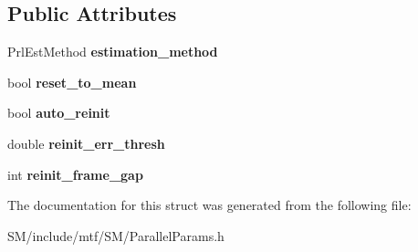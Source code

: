 \subsection*{Public Attributes}
\begin{DoxyCompactItemize}
\item 
\hypertarget{structParallelParams_a83f1bdd7bb0b1f79e8b4dc1daaf01b04}{Prl\-Est\-Method {\bfseries estimation\-\_\-method}}\label{structParallelParams_a83f1bdd7bb0b1f79e8b4dc1daaf01b04}

\item 
\hypertarget{structParallelParams_afe01009025027558172eb1effcb42fb5}{bool {\bfseries reset\-\_\-to\-\_\-mean}}\label{structParallelParams_afe01009025027558172eb1effcb42fb5}

\item 
\hypertarget{structParallelParams_a96ff70b51ba92852f875096b6d533ffc}{bool {\bfseries auto\-\_\-reinit}}\label{structParallelParams_a96ff70b51ba92852f875096b6d533ffc}

\item 
\hypertarget{structParallelParams_a0d8407f06fd7405f52d43372574dc657}{double {\bfseries reinit\-\_\-err\-\_\-thresh}}\label{structParallelParams_a0d8407f06fd7405f52d43372574dc657}

\item 
\hypertarget{structParallelParams_a4670e3549284e8e7569444727abc4cde}{int {\bfseries reinit\-\_\-frame\-\_\-gap}}\label{structParallelParams_a4670e3549284e8e7569444727abc4cde}

\end{DoxyCompactItemize}


The documentation for this struct was generated from the following file\-:\begin{DoxyCompactItemize}
\item 
S\-M/include/mtf/\-S\-M/Parallel\-Params.\-h\end{DoxyCompactItemize}
